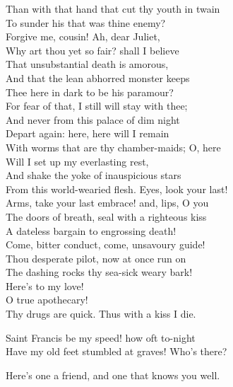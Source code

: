 \begin{speech}
Than with that hand that cut thy youth in twain \\
To sunder his that was thine enemy? \\
Forgive me, cousin!   Ah, dear Juliet, \\
Why art thou yet so fair? shall I believe \\
That unsubstantial death is amorous, \\
And that the lean abhorred monster keeps \\
Thee here in dark to be his paramour? \\
For fear of that, I still will stay with thee; \\
And never from this palace of dim night \\
Depart again: here, here will I remain \\
With worms that are thy chamber-maids; O, here \\
Will I set up my everlasting rest, \\
And shake the yoke of inauspicious stars \\
From this world-wearied flesh.   Eyes, look your last! \\
Arms, take your last embrace! and, lips, O you \\
The doors of breath, seal with a righteous kiss \\
A dateless bargain to engrossing death! \\
Come, bitter conduct, come, unsavoury guide! \\
Thou desperate pilot, now at once run on \\
The dashing rocks thy sea-sick weary bark! \\
Here's to my love!  \\
O true apothecary! \\
Thy drugs are quick. Thus with a kiss I die.   \\
\end{speech}
\begin{speech}
Saint Francis be my speed! how oft to-night \\

Have my old feet stumbled at graves! Who's there? \\
\end{speech}
\begin{speech}
Here's one a friend, and one that knows you well.
\\
\end{speech}
